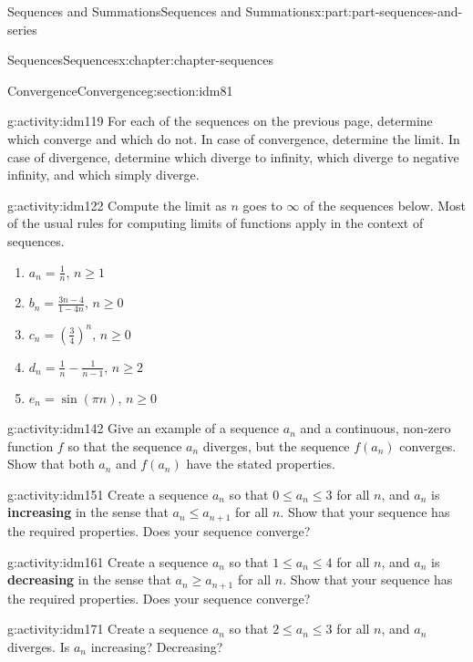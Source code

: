 \documentclass[oneside,10pt,]{book}
\newcommand{\terminology}[1]{\textbf{#1}}
\begin{document}
\begin{partptx}{Sequences and Summations}{}{Sequences and Summations}{}{}{x:part:part-sequences-and-series}
\begin{chapterptx}{Sequences}{}{Sequences}{}{}{x:chapter:chapter-sequences}
\begin{sectionptx}{Convergence}{}{Convergence}{}{}{g:section:idm81}
\begin{activity}{}{g:activity:idm119}%
For each of the sequences on the previous page, determine which converge and which do not. In case of convergence, determine the limit. In case of divergence, determine which diverge to infinity, which diverge to negative infinity, and which simply diverge.%
\end{activity}
\begin{activity}{}{g:activity:idm122}%
Compute the limit as \(n\) goes to \(\infty\) of the sequences below. Most of the usual rules for computing limits of functions apply in the context of sequences.%
\begin{enumerate}[font=\bfseries,label=(\alph*),ref=\alph*]
\item{}\(a_n = \frac{1}{n}\), \(n \geq 1\)\item{}\(b_n = \frac{3n-4}{1-4n}\), \(n \geq 0\)\item{}\(c_n = \left(\frac{3}{4}\right)^n\), \(n \geq 0\)\item{}\(d_n = \frac{1}{n} - \frac{1}{n-1}\), \(n \geq 2\)\item{}\(e_n = \sin(\pi n)\), \(n \geq 0\)\end{enumerate}
\end{activity}
\begin{activity}{}{g:activity:idm142}%
Give an example of a sequence \(a_n\) and a continuous, non-zero function \(f\) so that the sequence \(a_n\) diverges, but the sequence \(f(a_n)\) converges. Show that both \(a_n\) and \(f(a_n)\) have the stated properties.%
\end{activity}
\begin{activity}{}{g:activity:idm151}%
Create a sequence \(a_n\) so that \(0 \leq a_n \leq 3\) for all \(n\), and \(a_n\) is \terminology{increasing} in the sense that \(a_n \leq a_{n+1}\) for all \(n\). Show that your sequence has the required properties. Does your sequence converge?%
\end{activity}
\begin{activity}{}{g:activity:idm161}%
Create a sequence \(a_n\) so that \(1 \leq a_n \leq 4\) for all \(n\), and \(a_n\) is \terminology{decreasing} in the sense that \(a_n \geq a_{n+1}\) for all \(n\). Show that your sequence has the required properties. Does your sequence converge?%
\end{activity}
\begin{activity}{}{g:activity:idm171}%
Create a sequence \(a_n\) so that \(2 \leq a_n \leq 3\) for all \(n\), and \(a_n\) diverges. Is \(a_n\) increasing? Decreasing?%

\end{activity}
\end{sectionptx}
\end{chapterptx}
\end{partptx}
\end{document}
